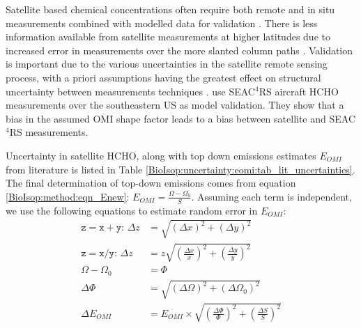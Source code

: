     Satellite based chemical concentrations often require both remote and in situ measurements combined with modelled data for validation \parencite{Marais2014}.
    There is less information available from satellite measurements at higher latitudes due to increased error in measurements over the more slanted column paths \parencite{DeSmedt2015}.
    Validation is important due to the various uncertainties in the satellite remote sensing process, with a priori assumptions having the greatest effect on structural uncertainty between measurements techniques \textcite{Lorente2017}.
    \textcite{Zhu2016} use SEAC$^4$RS aircraft HCHO measurements over the southeastern US as model validation. 
    They show that a bias in the assumed OMI shape factor leads to a bias between satellite and SEAC$^4$RS measurements.
    
    Uncertainty in satellite HCHO, along with top down emissions estimates $E_{OMI}$ from literature is listed in Table \ref{BioIsop:uncertainty:eomi:tab_lit_uncertainties}.
    The final determination of top-down emissions comes from equation \ref{BioIsop:method:eqn_Enew}: $E_{OMI}=\frac{\Omega - \Omega_{0}}{S}$.
    Assuming each term is independent, we use the following equations to estimate random error in $E_{OMI}$:
    \begin{align*}
      \mathtt{z=x+y:} \, \Delta{z} & = \sqrt{(\Delta{x})^2 + (\Delta{y})^2} \\
      \mathtt{z=x/y:} \, \Delta{z} & = z \sqrt{(\frac{\Delta{x}}{x})^2 + (\frac{\Delta{y}}{y})^2} \\
      \Omega - \Omega_{0} & = \Phi \\
      \Delta{\Phi} & = \sqrt{(\Delta{\Omega})^2 + (\Delta{\Omega_{0}})^2} \\
      \Delta{E_{OMI}} &= E_{OMI} \times \sqrt{(\frac{\Delta{\Phi}}{\Phi})^2 + (\frac{\Delta{S}}{S})^2}
    \end{align*}
    
